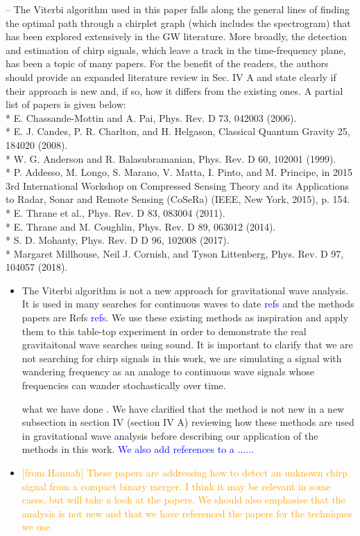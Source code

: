 \documentclass{article}
\newcommand{\todo}{\textcolor{blue}}
\newcommand{\han}{\textcolor{orange}}
\begin{document}
\noindent
-- The Viterbi algorithm used in this paper falls along the general lines of finding the optimal path through a chirplet graph (which includes the spectrogram) that has been explored extensively in the GW literature. More broadly, the detection and estimation of chirp signals, which leave a track in the time-frequency plane, has been a topic of many papers. For the benefit of the readers, the authors should provide an expanded literature review in Sec. IV A and state clearly if their approach is new and, if so, how it differs from the existing ones. A partial list of papers is given below: \\    
* E. Chassande-Mottin and A. Pai, Phys. Rev. D 73, 042003 (2006). \\
* E. J. Candes, P. R. Charlton, and H. Helgason, Classical Quantum Gravity 25, 184020 (2008).   \\
* W. G. Anderson and R. Balasubramanian, Phys. Rev. D 60, 102001 (1999).   \\
* P. Addesso, M. Longo, S. Marano, V. Matta, I. Pinto, and M. Principe, in 2015 3rd International Workshop on  Compressed Sensing Theory and its Applications to Radar, Sonar and Remote Sensing (CoSeRa) (IEEE, New York, 2015), p. 154.   \\
* E. Thrane et al., Phys. Rev. D 83, 083004 (2011).   \\
* E. Thrane and M. Coughlin, Phys. Rev. D 89, 063012 (2014).    \\
* S. D. Mohanty, Phys. Rev. D  D 96, 102008 (2017).   \\
* Margaret Millhouse, Neil J. Cornish, and Tyson Littenberg, Phys. Rev. D 97, 104057 (2018).\\
\begin{itemize}
\item The Viterbi algorithm is not a new approach for gravitational wave analysis. It is used in many searches for continuous waves to date \todo{refs} and the methods papers are Refs \todo{refs}. We use these existing methods as inspiration and apply them to this table-top experiment in order to demonstrate the real gravitaitonal wave searches using sound. It is important to clarify that we are not searching for chirp signals in this work, we are simulating a signal with wandering frequency as an analoge to continuous wave signals whose frequencies can wander stochastically over time. 
\item [what we have done]. We have clarified that the method is not new in a new subsection in section IV (section IV A) reviewing how these methods are used in gravitational wave analysis before describing our application of the methods in this work. \todo{We also add references to a ......}
\item \han{[from Hannah] These papers are addressing how to detect an unknown chirp signal from a compact binary merger. I think it may be relevant in some cases, but will take a look at the papers. We should also emphasise that the analysis is not new and that we have referenced the papers for the techniques we use. }
\end{itemize}
\end{document}
